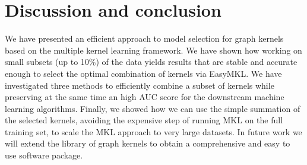 \documentclass{esannV2}
\newcommand{\1}{{\bf 1}}
\begin{document}
\section{Discussion and conclusion} 
%
We have presented an efficient approach to model selection for graph kernels
based on the multiple kernel learning framework. We have shown how working on
small subsets (up to 10\%) of the data yields results that are stable and
accurate enough to select the optimal combination of kernels via EasyMKL.
We have investigated three methods to efficiently combine a subset of
kernels while preserving at the same time an high AUC score for the downstream
machine learning algorithms. Finally, we showed how we can use the simple
summation of the selected kernels, avoiding the expensive step of running MKL
on the full training set, to scale the MKL approach to very large
datasets.
In future work we will extend the library of graph kernels to obtain a
comprehensive and easy to use software package.  

%
\vspace{-0.2cm}
\begin{footnotesize}
%


%


%
\end{footnotesize}
%
\end{document}
